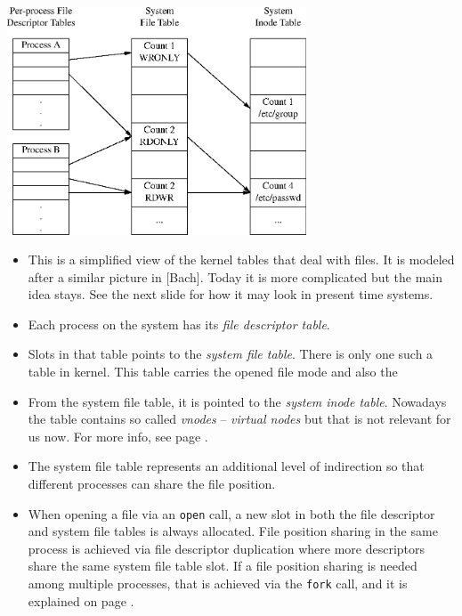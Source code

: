 
\begin{slide}
\begin{center}
%
\includegraphics[width=89mm]{img/eps/open_files1.eps}
\end{center}
\end{slide}

\label{OPENFILETABLES}

\begin{itemize}
\item This is a simplified view of the kernel tables that deal with files.  It
is modeled after a similar picture in [Bach].  Today it is more complicated but
the main idea stays.  See the next slide for how it may look in present time
systems.
\item Each process on the system has its \emph{file descriptor table}.
\item Slots in that table points to the \emph{system file table}.  There is
only one such a table in kernel.  This table carries the opened file mode and
also the 
\item From the system file table, it is pointed to the \emph{system inode
table}.  Nowadays the table contains so called \emph{vnodes} -- \emph{virtual
nodes} but that is not relevant for us now. For more info, see page
\pageref{VFS}.
\item The system file table represents an additional level of indirection so
that different processes can share the file position.
\item When opening a file via an \texttt{open} call, a new slot in both the file
descriptor and system file tables is always allocated.  File position sharing in
the same process is achieved via file descriptor duplication where more
descriptors share the same system file table slot.  If a file position sharing
is needed among multiple processes, that is achieved via the \texttt{fork}
call, and it is explained on page \pageref{FDSHARING}.
\end{itemize}


